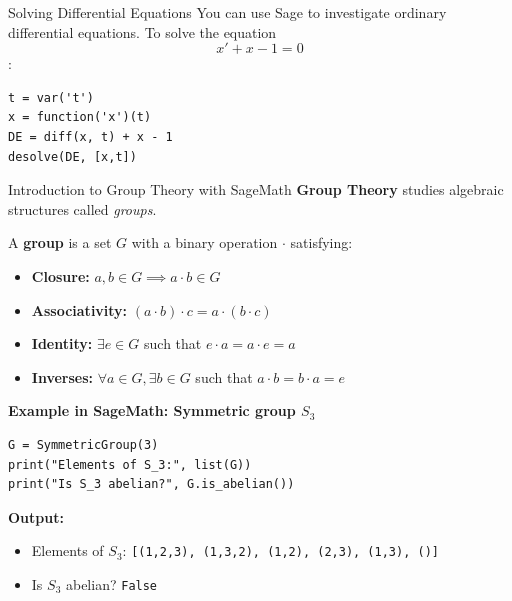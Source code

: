 \documentclass[10pt]{beamer}
\begin{document}
\begin{frame}[fragile]{Solving Differential Equations}
You can use Sage to investigate ordinary differential equations. To solve the equation $$x'+x-1=0$$:

\begin{lstlisting}[style=mypython]
t = var('t')    
x = function('x')(t)   
DE = diff(x, t) + x - 1
desolve(DE, [x,t])
\end{lstlisting}
\end{frame}
\begin{frame}[fragile]{Introduction to Group Theory with SageMath}
\textbf{Group Theory} studies algebraic structures called \emph{groups}.

A \textbf{group} is a set $G$ with a binary operation $\cdot$ satisfying:
\begin{itemize}
\item \textbf{Closure:} $a, b \in G \implies a \cdot b \in G$
\item \textbf{Associativity:} $(a \cdot b) \cdot c = a \cdot (b \cdot c)$
\item \textbf{Identity:} $\exists e \in G$ such that $e \cdot a = a \cdot e = a$
\item \textbf{Inverses:} $\forall a \in G, \exists b \in G$ such that $a \cdot b = b \cdot a = e$
\end{itemize}
\textbf{Example in SageMath: Symmetric group $S_3$}
\vspace{1mm}
\begin{lstlisting}[style=mypython]
G = SymmetricGroup(3)
print("Elements of S_3:", list(G))
print("Is S_3 abelian?", G.is_abelian())
\end{lstlisting}

\vspace{-1mm}
\textbf{Output:}
\begin{itemize}
\item Elements of $S_3$: \texttt{[(1,2,3), (1,3,2), (1,2), (2,3), (1,3), ()]}
\item Is $S_3$ abelian? \texttt{False}
\end{itemize}
\end{frame}
\end{document}
